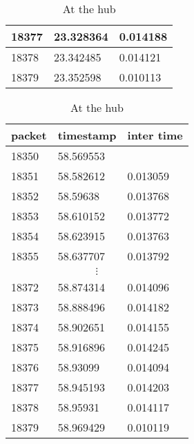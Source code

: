 \documentclass[a4paper,9pt]{beamer}
\begin{document}
{\begin{table}[htbp]
\begin{minipage}{0.5\linewidth}
\begin{tabular}{|l|l|l|}
\hline
18377&23.328364&0.014188\\
\hline
18378&23.342485&0.014121\\
\hline
18379&23.352598&0.010113\\
\hline
  \end{tabular}
  \end{minipage}
  \begin{minipage}{0.4\linewidth}%
  \caption{At the hub}
  \begin{tabular}{|l|l|l|}
    \hline 
     packet      &  timestamp  &inter time\\
\hline  
18350&58.569553&\\
\hline
18351&58.582612&0.013059\\
\hline
18352&58.59638&0.013768\\
\hline
18353&58.610152&0.013772\\
\hline
18354&58.623915&0.013763\\
\hline
18355&58.637707&0.013792\\
\hline
\multicolumn{3}{|c|}{$\vdots$} \\
\hline
18372&58.874314&0.014096\\
\hline
18373&58.888496&0.014182\\
\hline
18374&58.902651&0.014155\\
\hline
18375&58.916896&0.014245\\
\hline
18376&58.93099&0.014094\\
\hline
18377&58.945193&0.014203\\
\hline
18378&58.95931&0.014117\\
\hline
18379&58.969429&0.010119\\
\hline
  \end{tabular}
  \end{minipage}
\end{table}

}
\end{document}
